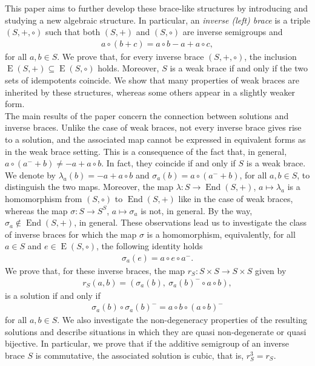 \documentclass[preprint,1p]{elsarticle}
\theoremstyle{definition}               %
\DeclareMathOperator{\End}{End}
\DeclareMathOperator{\E}{E}
\begin{document}
This paper aims to further develop these brace-like structures by introducing and studying a new algebraic structure. In particular, an \emph{inverse (left) brace} is a triple $\left(S,+,\circ\right)$ such that both $\left(S,+\right)$ and $\left(S,\circ\right)$ are inverse semigroups and \begin{align*}
    a \circ (b+c)=a \circ b-a+a\circ c,
\end{align*}
for all $a, b \in S$. We prove that, for every inverse brace $(S, +, \circ)$, the inclusion $\E(S, +) \subseteq \E(S, \circ)$ holds.
Moreover, $S$ is a weak brace if and only if the two sets of idempotents coincide. We show that many properties of weak braces are inherited by these structures, whereas some others appear in a slightly weaker form.\\
 The main results of the paper concern the connection between solutions and inverse braces. Unlike the case of weak braces, not every inverse brace gives rise to a solution, and the associated map cannot be expressed in equivalent forms as in the weak brace setting. This is a consequence of the fact that, in general, $a \circ \left(a^-+b\right) \neq -a+a \circ b$. In fact, they coincide if and only if $S$ is a weak brace. We denote by $\lambda_a(b)=-a+a\circ b$ and $\sigma_a(b)=a \circ \left(a^-+b\right)$, for all $a, b \in S$, to distinguish the two maps. Moreover, the map $\lambda: S \to \End(S, +)$, $a \mapsto \lambda_a$ is a homomorphism from $(S, \circ)$ to $\End(S, +)$ like in the case of weak braces, whereas the map $\sigma: S \to S^S$, $a \mapsto \sigma_a$ is not, in general. By the way, $\sigma_a \notin \End(S, +)$, in general. These observations lead us to investigate the class of inverse braces for which the map $\sigma$ is a homomorphism, equivalently, for all $a \in S$ and $e \in \E(S, \circ)$, the following identity holds
\begin{align}
  \sigma_a(e)= a \circ e \circ a^-.\tag{I}
\end{align}
We prove that, for these inverse braces, the map $r_S: S  \times S \to S \times S$ given by
\begin{align*}
    r_S\left(a,b\right)
    = \left(\sigma_a(b), \ \sigma_a(b)^-\circ a \circ b\right),
\end{align*}
is a solution if and only if
\begin{align}
 \sigma_a(b) \circ \sigma_a(b)^- =   a \circ b \circ (a \circ b)^-\tag{II}
\end{align}
for all $a, b \in S$. 
We also investigate the non-degeneracy properties of the resulting solutions and describe situations in which they are quasi non-degenerate or quasi bijective. In particular, we prove that if the additive semigroup of an inverse brace $S$ is commutative, the associated solution is cubic, that is, $r_S^3=r_S$.
\end{document}
